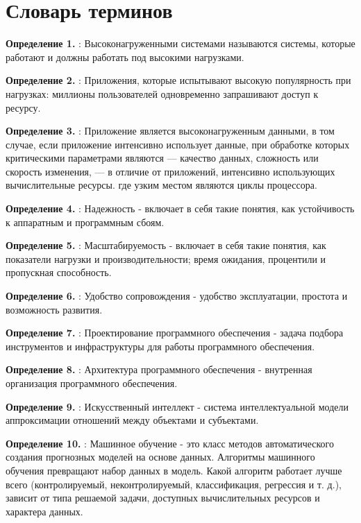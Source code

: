\chapter*{Словарь терминов}             %
\label{ch:tez}  %


\textbf{Определение 1.} : Высоконагруженными системами называются системы, которые работают и должны работать под высокими нагрузками. 

\textbf{Определение 2.} : Приложения, которые испытывают высокую популярность при нагрузках: миллионы пользователей одновременно запрашивают доступ к ресурсу.


\textbf{Определение 3.} : Приложение является высоконагруженным данными, в том случае, если приложение интенсивно использует данные, при обработке которых критическими параметрами являются — качество данных, сложность или скорость изменения, — в отличие от приложений, интенсивно использующих вычислительные ресурсы.
где узким местом являются циклы процессора.

\textbf{Определение 4.} :  Надежность - включает в себя такие понятия, как устойчивость к аппаратным и программным сбоям. 

\textbf{Определение 5.} : Масштабируемость - включает в себя такие понятия, как показатели нагрузки и производительности; время ожидания, процентили и пропускная способность.

\textbf{Определение 6.} :  Удобство сопровождения - удобство эксплуатации, простота и возможность развития.

\textbf{Определение 7.} : Проектирование программного обеспечения - задача подбора инструментов и инфраструктуры для работы программного обеспечения.

\textbf{Определение 8.} :  Архитектура программного обеспечения - внутренная организация программного обеспечения.

\textbf{Определение 9.} :  Искусственный интеллект - система интеллектуальной модели аппроксимации отношений между объектами и субъектами.

\textbf{Определение 10.} :  Машинное обучение - это класс методов автоматического создания прогнозных моделей на основе данных. Алгоритмы машинного обучения превращают набор данных в модель. Какой алгоритм работает лучше всего (контролируемый, неконтролируемый, классификация, регрессия и т. д.), зависит от типа решаемой задачи, доступных вычислительных ресурсов и характера данных.

